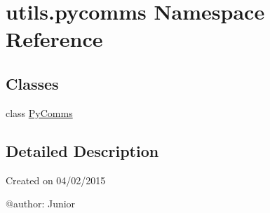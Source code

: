 \hypertarget{namespaceutils_1_1pycomms}{}\section{utils.\+pycomms Namespace Reference}
\label{namespaceutils_1_1pycomms}
\subsection*{Classes}
\begin{DoxyCompactItemize}
\item 
class \hyperlink{classutils_1_1pycomms_1_1PyComms}{Py\+Comms}
\end{DoxyCompactItemize}


\subsection{Detailed Description}
\begin{DoxyVerb}Created on 04/02/2015

@author: Junior
\end{DoxyVerb}
 